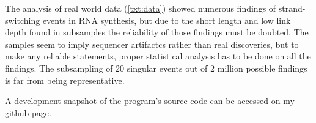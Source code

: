 \documentclass[11pt]{article}
\begin{document}
The analysis of real world data (\ref{txt:data}) showed numerous findings of strand-switching
events in RNA synthesis, but due to the short length and low link depth found in subsamples the
reliability of those findings must be doubted. The samples seem to imply sequencer artifactcs 
rather than real discoveries, but to make any reliable statements, proper statistical analysis 
has to be done on all the findings. The subsampling of 20 singular events out of 2 million 
possible findings  is far from being representative.

A development snapshot of the program's source code can be accessed on \href{http://www.github.com/hermann-p/segemehl-visual}{my github page}.

\clearpage

\listoffigures

\listofalgorithms

\clearpage



\end{document}
